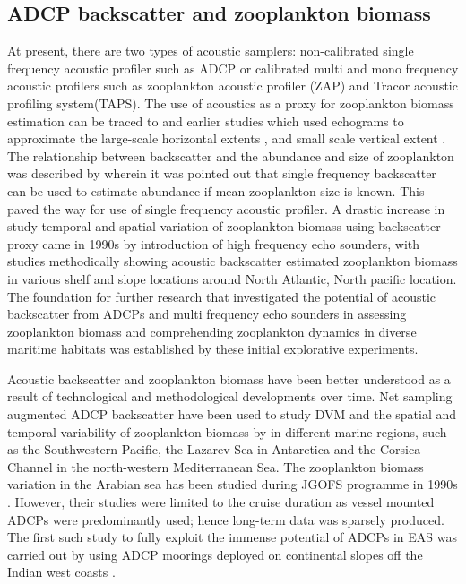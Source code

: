 \documentclass{article}
\begin{document}
	\subsection{ADCP backscatter and zooplankton biomass}
	At present, there are two types of acoustic samplers: non-calibrated single frequency acoustic profiler such as ADCP or calibrated multi and mono frequency acoustic profilers such as zooplankton acoustic profiler (ZAP) and Tracor acoustic profiling system(TAPS). The use of acoustics as a proxy for zooplankton biomass estimation can be traced to \citep{pieper1971study, sameoto1977use} and earlier studies which used echograms to approximate the large-scale horizontal extents \citep{barraclough1969shallow}, and small scale vertical extent \citep{mcnaught1968acoustical}. The relationship between backscatter and the abundance and size of zooplankton was described by \citep{greenlaw1979acoustical} 
	wherein it was pointed out that single frequency backscatter can be used to estimate abundance if mean zooplankton size is known. This paved the way for use of single frequency acoustic profiler. A drastic increase in study temporal and spatial variation of zooplankton biomass using  backscatter-proxy came in 1990s by introduction of high frequency echo sounders, with studies \citep{flagg1989use, wiebe1990sound, batchelder00981, greene1998three, rippeth1998diur} methodically showing acoustic backscatter estimated zooplankton biomass in various shelf and slope locations around  North Atlantic, North pacific location. The foundation for further research that investigated the potential of acoustic backscatter from ADCPs and multi frequency echo sounders in assessing zooplankton biomass and comprehending zooplankton dynamics in diverse maritime habitats was established by these initial explorative experiments.
	
	 Acoustic backscatter and zooplankton biomass have been better understood as a result of technological and methodological developments over time. Net sampling augmented ADCP backscatter have been used to study DVM and the spatial and temporal variability of zooplankton biomass by \citep{cisewski2010seasonal,smeti2015spatial, guerra2019zooplankton} in different marine regions, such as the Southwestern Pacific, the Lazarev Sea in Antarctica and the Corsica Channel in the north-western Mediterranean Sea.	The zooplankton biomass variation in the Arabian sea has been studied during JGOFS programme in 1990s \citep{herring1998across, nair1999arabian, fielding2004biological, smith2005mesozooplankton}. However, their studies were limited to the cruise duration as vessel mounted ADCPs were predominantly used; hence long-term data was sparsely produced. The first such study to fully exploit the immense potential of ADCPs in EAS was carried out by \citep{aparna2022seasonal} using ADCP moorings deployed on continental slopes off the Indian west coasts \citep{amol2014observed, chaudhuri2020observed}.
	
\end{document}
